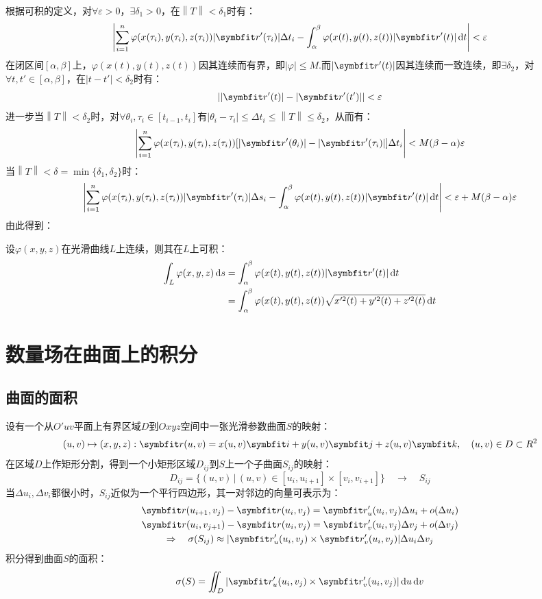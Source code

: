 根据可积的定义，对$\forall\varepsilon>0$，$\exists\delta_1>0$，在$\left\|T\right\|<\delta_1$时有：
\[\left|\sum_{i=1}^{n}\varphi(x(\tau_i),y(\tau_i),z(\tau_i))|\vb{r}'(\tau_i)|\Delta t_i - \int_{\alpha}^{\beta}\varphi(x(t),y(t),z(t))|\vb{r}'(t)|\dd{t}\right| < \varepsilon\]
在闭区间$[\alpha,\beta]$上，$\varphi(x(t),y(t),z(t))$因其连续而有界，即$|\varphi|\leqslant M$.而$|\vb{r}'(t)|$因其连续而一致连续，即$\exists\delta_2$，对$\forall t,t'\in[\alpha,\beta]$，在$|t-t'|<\delta_2$时有：
\[||\vb{r}'(t)|-|\vb{r}'(t')||<\varepsilon\]
进一步当$\left\|T\right\|<\delta_2$时，对$\forall\theta_i,\tau_i\in[t_{i-1},t_i]$有$|\theta_i-\tau_i|\leqslant\Delta t_i \leqslant\left\|T\right\|\leqslant\delta_2$，从而有：
\[\left|\sum_{i=1}^{n}\varphi(x(\tau_i),y(\tau_i),z(\tau_i))[|\vb{r}'(\theta_i)|-|\vb{r}'(\tau_i)|]\Delta t_i\right| < M(\beta-\alpha)\varepsilon\]
当$\left\|T\right\| < \delta = \min\{\delta_1,\delta_2\}$时：
\[\left|\sum_{i=1}^{n}\varphi(x(\tau_i),y(\tau_i),z(\tau_i))|\vb{r}'(\tau_i)|\Delta s_i - \int_{\alpha}^{\beta}\varphi(x(t),y(t),z(t))|\vb{r}'(t)|\dd{t}\right| < \varepsilon + M(\beta-\alpha)\varepsilon\]
由此得到：
\begin{theorem}
    设$\varphi(x,y,z)$在光滑曲线$L$上连续，则其在$L$上可积：
    \begin{align*}
        \int_L \varphi(x,y,z)\dd{s} &= \int_{\alpha}^{\beta}\varphi(x(t),y(t),z(t))|\vb{r}'(t)|\dd{t} \\
        &=\int_{\alpha}^{\beta}\varphi(x(t),y(t),z(t))\sqrt{x'^2(t)+y'^2(t)+z'^2(t)}\dd{t}
    \end{align*}
\end{theorem}


\section{数量场在曲面上的积分}
\subsection{曲面的面积}
设有一个从$O'uv$平面上有界区域$D$到$Oxyz$空间中一张光滑参数曲面$S$的映射：
\[(u,v)\mapsto(x,y,z):\vb{r}(u,v) = x(u,v)\vb{i} + y(u,v)\vb{j} + z(u,v)\vb{k},\quad (u,v)\in D \subset\mathbb{R}^2\]
在区域$D$上作矩形分割，得到一个小矩形区域$D_{ij}$到$S$上一个子曲面$S_{ij}$的映射：
\[D_{ij} = \{(u,v)\,|\,(u,v)\in[u_i,u_{i+1}]\times[v_i,v_{i+1}]\}\quad \to \quad S_{ij}\]
当$\Delta u_i,\Delta v_i$都很小时，$S_{ij}$近似为一个平行四边形，其一对邻边的向量可表示为：
\begin{gather*}
    \vb{r}(u_{i+1},v_j) - \vb{r}(u_i,v_j) = \vb{r}'_u(u_i,v_j)\Delta u_i + o(\Delta u_i)\\
    \vb{r}(u_i,v_{j+1}) - \vb{r}(u_i,v_j) = \vb{r}'_v(u_i,v_j)\Delta v_j + o(\Delta v_j)\\
    \Rightarrow\quad \sigma(S_{ij}) \approx |\vb{r}'_u(u_i,v_j) \times \vb{r}'_v(u_i,v_j)|\Delta u_i \Delta v_j
\end{gather*}
积分得到曲面$S$的面积：
\[\sigma(S) = \iint_D |\vb{r}'_u(u_i,v_j) \times \vb{r}'_v(u_i,v_j)|\dd{u}\dd{v}\]

